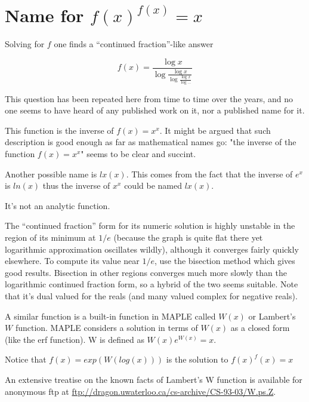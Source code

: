 \section{Name for $f(x)^{f(x)}=x$}


Solving for $f$ one finds a ``continued fraction''-like answer

               \begin{equation}
            f(x) = \frac{\log x}{\log
                     \frac{\log x}{\log
                      \frac{\log x}{\log\ldots } } }
\end{equation}


 This question has been repeated here from time to time over the
    years, and no one seems to have heard of any published work on it,
    nor a published name for it. 


This function is the inverse of $f(x)=x^x$. It might be argued that
such description is good enough as far as mathematical names go: 
"the inverse of the function $f(x)=x^x$" seems to be clear and succint.

Another possible name is $lx(x)$. This comes from the fact that
the inverse of $e^x$ is $ln(x)$ thus the inverse of $x^x$ could be
named $lx(x)$.




It's not an analytic function.

    The ``continued fraction'' form for its numeric solution is highly
    unstable in the region of its minimum at $1/e$ (because the graph is
    quite flat there yet logarithmic approximation oscillates wildly),
    although it converges fairly quickly elsewhere. To compute its value
    near $1/e$, use the bisection method which gives good results. Bisection
    in other regions converges much more slowly than the logarithmic
    continued fraction form, so a hybrid of the two seems suitable.
    Note that it's dual valued for the reals (and many valued complex
    for negative reals).

    A similar function is a built-in function in MAPLE called $W(x)$
 or Lambert's $W$ function.
    MAPLE considers a solution in terms of $W(x)$ as a closed form (like
    the erf function). W is defined as $W(x)e^{W(x)}=x$.

    Notice that $f(x) = exp(W(log(x)))$ is the solution to $f(x)^f(x)=x$

    An extensive treatise on the known facts of Lambert's W function
    is available for anonymous ftp at
    \url{ftp://dragon.uwaterloo.ca/cs-archive/CS-93-03/W.ps.Z}.
